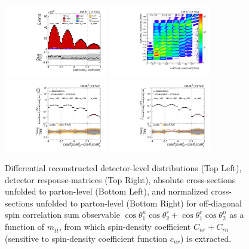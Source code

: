\clearpage
\begin{figure}[htb]
\begin{center}
 \includegraphics[width=0.40\textwidth]{fig_fullRun2UL/controlplots/combined/Hyp_LLBarCPnr_vs_TTBarMass.pdf}
 \includegraphics[width=0.40\textwidth]{fig_fullRun2UL/unfolding/combined/ResponseMatrix_c_Pnr_mttbar.pdf} \\
 \includegraphics[width=0.40\textwidth]{fig_fullRun2UL/unfolding/combined/UnfoldedResults_c_Pnr_mttbar.pdf}
 \includegraphics[width=0.40\textwidth]{fig_fullRun2UL/unfolding/combined/UnfoldedResultsNorm_c_Pnr_mttbar.pdf} \\
\label{fig:c_Pnr_mttbar}
\caption{Differential reconstructed detector-level distributions (Top Left), detector response-matrices (Top Right), absolute cross-sections unfolded to parton-level (Bottom Left), and normalized cross-sections unfolded to parton-level (Bottom Right) for off-diagonal spin correlation sum observable $\cos\theta_{1}^{n}\cos\theta_{2}^{r}+\cos\theta_{1}^{r}\cos\theta_{2}^{n}$ as a function of $m_{t\bar{t}}$, from which spin-density coefficient $C_{nr}+C_{rn}$ (sensitive to spin-density coefficient function $c_{n r}$) is extracted.}
\end{center}
\end{figure}
\clearpage
